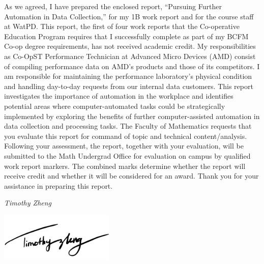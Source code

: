 \documentclass[12pt]{article}
\newcommand{\term}{1B } %
\newcommand{\WTT}{Pursuing Further Automation in Data Collection}
\begin{document}




\FirstPage

\newpage




\LetterHead



As we agreed, I have prepared the enclosed report, “\WTT,” for
my \term work report and for the course staff at WatPD. This
report, the first of four work reports that the Co-operative Education Program
requires that I successfully complete as part of my BCFM Co-op degree
requirements, has not received academic credit.
\vskip 10pt
My responsibilities as Co-OpST Performance Technician at Advanced Micro Devices (AMD) consist of compiling performance data on AMD's products and those of its competitors. I am responsible for maintaining the performance laboratory's physical condition and handling day-to-day requests from our internal data customers. This report investigates the importance of automation in the workplace and identifies potential areas where computer-automated tasks could be strategically implemented by exploring the benefits of further computer-assisted automation in data collection and processing tasks. 
\vskip 10pt 
The Faculty of Mathematics requests that you evaluate this report for command
of topic and technical content/analysis. Following your assessment, the report,
together with your evaluation, will be submitted to the Math Undergrad Office
for evaluation on campus by qualified work report markers. The combined
marks determine whether the report will receive credit and whether it will be
considered for an award.
\vskip 10pt 
Thank you for your assistance in preparing this report.

\emph{Timothy Zheng}

\includegraphics[height=2.339cm]{signature.png}
\end{document}
